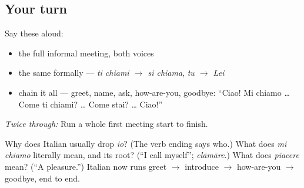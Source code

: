 \subsection*{Your turn}
Say these aloud:

\begin{itemize}
\raggedright
  \item the full informal meeting, both voices
  \item the same formally — \emph{ti chiami $\to$ si chiama}, \emph{tu $\to$ Lei}
  \item chain it all — greet, name, ask, how-are-you, goodbye: \textquotedblleft{}Ciao! Mi chiamo … Come ti chiami? … Come stai? … Ciao!\textquotedblright{}
\end{itemize}

\emph{Twice through:} Run a whole first meeting start to finish.

\begin{tcolorbox}[breakable,colback=teal!4,colframe=teal!35!black,title={Before you move on}]
Why does Italian usually drop \emph{io}? (The verb ending says who.) What does \emph{mi chiamo} literally mean, and its root? (\textquotedblleft{}I call myself\textquotedblright{}; \emph{clāmāre}.) What does \emph{piacere} mean? (\textquotedblleft{}A pleasure.\textquotedblright{}) Italian now runs greet $\to$ introduce $\to$ how-are-you $\to$ goodbye, end to end.
\end{tcolorbox}
